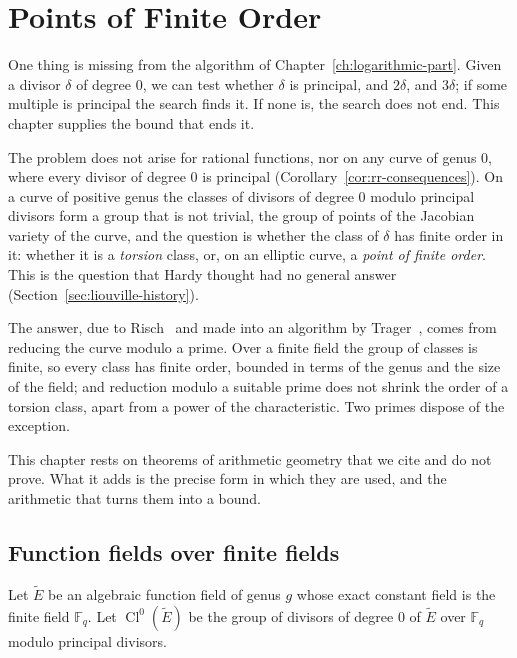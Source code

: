 \chapter{Points of Finite Order}\label{ch:finite-order}

One thing is missing from the algorithm of
Chapter~\ref{ch:logarithmic-part}. Given a divisor $\delta$ of degree $0$,
we can test whether $\delta$ is principal, and $2\delta$, and $3\delta$; if
some multiple is principal the search finds it. If none is, the search does
not end. This chapter supplies the bound that ends it.

The problem does not arise for rational functions, nor on any curve of genus
$0$, where every divisor of degree $0$ is principal
(Corollary~\ref{cor:rr-consequences}). On a curve of positive genus the
classes of divisors of degree $0$ modulo principal divisors form a group that
is not trivial, the group of points of the Jacobian variety of the curve, and
the question is whether the class of $\delta$ has finite order in it: whether
it is a \emph{torsion} class, or, on an elliptic curve, a \emph{point of
finite order}. This is the question that Hardy thought had no general
answer (Section~\ref{sec:liouville-history}).

The answer, due to Risch~\cite{risch1970} and made into an algorithm by
Trager~\cite[Chapter~6]{trager1984}, comes from reducing the curve modulo a
prime. Over a finite field the group of classes is finite, so every class has
finite order, bounded in terms of the genus and the size of the field; and
reduction modulo a suitable prime does not shrink the order of a torsion
class, apart from a power of the characteristic. Two primes dispose of the
exception.

This chapter rests on theorems of arithmetic geometry that we cite and do
not prove. What it adds is the precise form in which they are used, and the
arithmetic that turns them into a bound.

\section{Function fields over finite fields}\label{sec:fo-finite}

Let $\tilde E$ be an algebraic function field of genus $g$ whose exact
constant field is the finite field $\mathbb{F}_q$. Let
$\operatorname{Cl}^0(\tilde E)$ be the group of divisors of degree $0$ of
$\tilde E$ over $\mathbb{F}_q$ modulo principal divisors.

